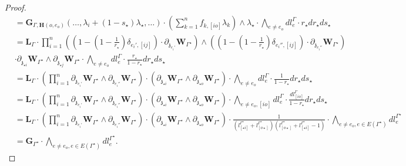 \documentclass[11pt]{amsart}
\theoremstyle{definition}
\theoremstyle{remark}
\numberwithin{equation}{section}
\begin{document}
\begin{proof}
\begin{align*}
   & =\mathbf{G}_{\Gamma,\mathbf{H}(o,e_o)}(\dots,\lambda_i+(1-s_{\star})\lambda_{\star},\dots)\cdot(\sum\limits_{k=1}^{n}f_{k,[io]}\lambda_k)\wedge \lambda_{\star }\cdot\bigwedge_{e\neq e_{o}}dl^{\Gamma}_{e} \cdot r_{\star}dr_{\star}ds_{\star}\\
&=\mathbf{L}_{\Gamma}\cdot\prod^n_{i=1}\left((1-(1-\frac{1}{r_{\star}})\delta_{e_i',[ij]})\cdot\partial_{\mathfrak{z}_{e_i'}}\mathbf{W}_{\Gamma^{\star}}\right)\wedge\left((1-(1-\frac{1}{r_{\star}})\delta_{e_i'',[ij]})\cdot\partial_{\mathfrak{z}_{e_i''}}\mathbf{W}_{\Gamma^{\star}}\right)\\
   &\cdot  \partial_{\mathfrak{z}_{\star i}}\mathbf{W}_{\Gamma^{\star}}\wedge \partial_{\mathfrak{z}_{\star j}}\mathbf{W}_{\Gamma^{\star}}\cdot \bigwedge_{e\neq e_{o}}dl^{\Gamma}_{e}\cdot  \frac{ r_{\star}}{1- r_{\star}} dr_{\star}ds_{\star}\\
     &=\mathbf{L}_{\Gamma}\cdot\left(\prod^n_{i=1}\partial_{\mathfrak{z}_{e_i'}}\mathbf{W}_{\Gamma^{\star}}\wedge\partial_{\mathfrak{z}_{e_i''}}\mathbf{W}_{\Gamma^{\star}}\right)\cdot  \left( \partial_{\mathfrak{z}_{\star i}}\mathbf{W}_{\Gamma^{\star}}\wedge \partial_{\mathfrak{z}_{\star o}}\mathbf{W}_{\Gamma^{\star}}\right)\cdot \bigwedge_{e\neq e_{o}}dl^{\Gamma}_{e}\cdot  \frac{1}{1- r_{\star}} dr_{\star}ds_{\star}\\
     &=\mathbf{L}_{\Gamma}\cdot\left(\prod^n_{i=1}\partial_{\mathfrak{z}_{e_i'}}\mathbf{W}_{\Gamma^{\star}}\wedge\partial_{\mathfrak{z}_{e_i''}}\mathbf{W}_{\Gamma^{\star}}\right)\cdot  \left( \partial_{\mathfrak{z}_{\star i}}\mathbf{W}_{\Gamma^{\star}}\wedge \partial_{\mathfrak{z}_{\star o}}\mathbf{W}_{\Gamma^{\star}}\right)\cdot \bigwedge_{e\neq e_{o},[io]}dl^{\Gamma}_{e} \cdot \frac{dl^{\Gamma}_{[io]}}{1-r_{\star}}dr_{\star}ds_{\star}\\
     &=\mathbf{L}_{\Gamma}\cdot\left(\prod^n_{i=1}\partial_{\mathfrak{z}_{e_i'}}\mathbf{W}_{\Gamma^{\star}}\wedge\partial_{\mathfrak{z}_{e_i''}}\mathbf{W}_{\Gamma^{\star}}\right)\cdot  \left( \partial_{\mathfrak{z}_{\star i}}\mathbf{W}_{\Gamma^{\star}}\wedge \partial_{\mathfrak{z}_{\star o}}\mathbf{W}_{\Gamma^{\star}}\right)\cdot\frac{1}{(l^{\Gamma^\star}_{[ \star i]}+l^{\Gamma^\star}_{[ o\star ]})(l^{\Gamma^\star}_{[ o\star]}+l^{\Gamma^\star}_{[ \star i]}-1)}\cdot \bigwedge_{e\neq e_{o},e\in E(\Gamma^{\star})}dl^{\Gamma^{\star}}_{e}\\
      &=\mathbf{G}_{\Gamma^{\star}}\cdot \bigwedge_{e\neq e_{o},e\in E(\Gamma^{\star})}dl^{\Gamma^{\star}}_{e}.
\end{align*}



\end{proof}
\end{document}
